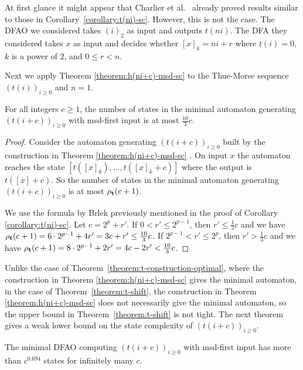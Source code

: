 \documentclass[12pt,reqno]{article}
\begin{document}
\begin{remark}
At first glance it might appear that
Charlier et al.~\cite{charlier_state_2019, charlier_minimal_2021} already proved results similar to those in Corollary~\ref{corollary:t(ni)-sc}.  However, this is not the case. The DFAO we considered takes $(i)_2$ as input and outputs $t(ni)$. The DFA they considered takes $x$ as input and decides whether $[x]_k=ni+r$ where $t(i)=0$, $k$ is a power of $2$, and $0 \leq r<n$.
\end{remark}



Next we apply Theorem \ref{theorem:h(ni+c)-msd-sc} to the Thue-Morse sequence $(t(i))_{i \geq 0}$ and $n=1$. 

\begin{theorem}\label{theorem:t-shift}
    For all integers $c \geq 1$, the number of states in the minimal automaton generating $(t(i+c))_{i \geq 0}$ with msd-first input is at most $\frac{10}{3}c$.
\end{theorem}

\begin{proof}
    Consider the automaton generating $(t(i+c))_{i \geq 0}$ built by the construction in Theorem \ref{theorem:h(ni+c)-msd-sc} . On input $x$ the automaton reaches the state $[t([x]_k), \ldots, t([x]_k + c)]$ where the output is $t([x]+c)$. So the number of states in the minimal automaton generating $(t(i+c))_{i \geq 0}$ is at most $\rho_{\bf t}(c+1)$.
    
    We use the formula by Brlek \cite{brlek_enumeration_1989} previously mentioned in the proof of Corollary \ref{corollary:t(ni)-sc}.
    Let $c=2^p+r'$.
    If $0 < r' \leq 2^{p-1}$, then $r'\leq\frac{1}{3}c$ and we have $\rho_{\bf t}(c+1) = 6\cdot 2^{p-1} + 4r' = 3c + r' \leq \frac{10}{3}c$.
    If $2^{p-1} < r' \leq 2^p$, then $r'>\frac{1}{3}c$ and we have $\rho_{\bf t}(c+1)= 8\cdot 2^{p-1}+2r'=4c -2r' < \frac{10}{3}c$.
\end{proof}

Unlike the case of Theorem~\ref{theorem:t-construction-optimal}, where the construction in Theorem \ref{theorem:h(ni+c)-msd-sc} gives the minimal
automaton, in the case of Theorem~\ref{theorem:t-shift}, the construction in Theorem \ref{theorem:h(ni+c)-msd-sc} does not
necessarily give the minimal automaton, so the upper bound in Theorem~\ref{theorem:t-shift} is not tight.  The next theorem gives a weak lower bound on 
the state complexity of $(t(i+c))_{i\geq 0}$.

\begin{theorem}
The minimal DFAO computing $(t(i+c))_{i\geq 0}$ with msd-first input has more than
$c^{0.694}$ states for infinitely many $c$.
\end{theorem}
\end{document}
